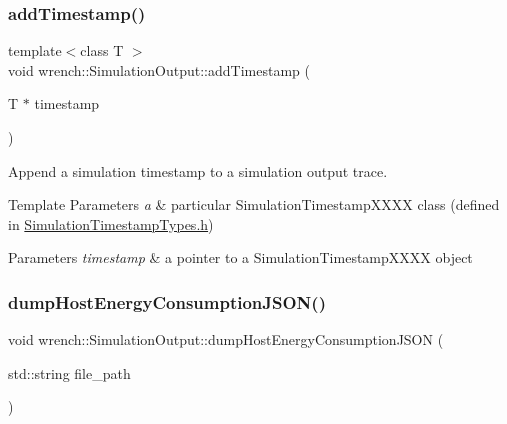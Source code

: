 \subsubsection{\texorpdfstring{add\+Timestamp()}{addTimestamp()}}
{\footnotesize\ttfamily template$<$class T $>$ \\
void wrench\+::\+Simulation\+Output\+::add\+Timestamp (\begin{DoxyParamCaption}\item[{T $\ast$}]{timestamp }\end{DoxyParamCaption})\hspace{0.3cm}{\ttfamily [inline]}}



Append a simulation timestamp to a simulation output trace. 


\begin{DoxyTemplParams}{Template Parameters}
{\em a} & particular Simulation\+Timestamp\+X\+X\+XX class (defined in \hyperlink{_simulation_timestamp_types_8h_source}{Simulation\+Timestamp\+Types.\+h}) \\
\hline
\end{DoxyTemplParams}

\begin{DoxyParams}{Parameters}
{\em timestamp} & a pointer to a Simulation\+Timestamp\+X\+X\+XX object \\
\hline
\end{DoxyParams}
\mbox{\label{classwrench_1_1_simulation_output_a789834c9727ec0cd28faaf5176eaeecf}} 
\subsubsection{\texorpdfstring{dump\+Host\+Energy\+Consumption\+J\+S\+O\+N()}{dumpHostEnergyConsumptionJSON()}}
{\footnotesize\ttfamily void wrench\+::\+Simulation\+Output\+::dump\+Host\+Energy\+Consumption\+J\+S\+ON (\begin{DoxyParamCaption}\item[{std\+::string}]{file\+\_\+path }\end{DoxyParamCaption})}



